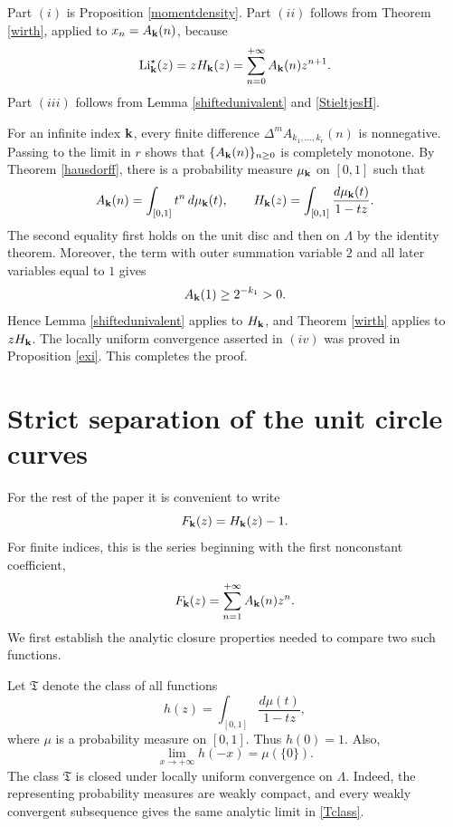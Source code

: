 \documentclass[12pt,a4paper]{amsart}
\makeatletter
\numberwithin{equation}{section}
\renewenvironment{proof}[1][Proof]{%
  \par\pushQED{\qed}%
  \normalfont\topsep6\p@\@plus6\p@\relax
  \trivlist
  \item[\hskip\labelsep\bfseries #1:]\ignorespaces
}{%
  \popQED\endtrivlist\@endpefalse
}
\theoremstyle{plain}
\theoremstyle{definition}
\makeatother
\begin{document}
\begin{proof}[Proof of Theorem \ref{cm}]
Part $(i)$ is Proposition \ref{momentdensity}.  Part $(ii)$ follows from Theorem \ref{wirth}, applied to $x_n=A_{\bf k}(n)$, because
\[
\mathrm{Li}^{\star}_{\bf k}(z)=zH_{\bf k}(z)
=\sum_{n=0}^{+\infty}A_{\bf k}(n)z^{n+1}.
\]
Part $(iii)$ follows from Lemma \ref{shiftedunivalent} and \eqref{StieltjesH}.

For an infinite index ${\bf k}$, every finite difference $\Delta^m A_{k_1,\ldots,k_r}(n)$ is nonnegative.  Passing to the limit in $r$ shows that $\{A_{\bf k}(n)\}_{n\geq 0}$ is completely monotone.  By Theorem \ref{hausdorff}, there is a probability measure $\mu_{\bf k}$ on $[0,1]$ such that
\begin{equation}\label{infiniteStieltjes}
A_{\bf k}(n)=\int_{[0,1]}t^n\,d\mu_{\bf k}(t),
\qquad
H_{\bf k}(z)=\int_{[0,1]}\frac{d\mu_{\bf k}(t)}{1-tz}.
\end{equation}
The second equality first holds on the unit disc and then on $\Lambda$ by the identity theorem.  Moreover, the term with outer summation variable $2$ and all later variables equal to $1$ gives
\[
A_{\bf k}(1)\geq 2^{-k_1}>0.
\]
Hence Lemma \ref{shiftedunivalent} applies to $H_{\bf k}$, and Theorem \ref{wirth} applies to $zH_{\bf k}$.  The locally uniform convergence asserted in $(iv)$ was proved in Proposition \ref{exi}.  This completes the proof.
\end{proof}

\section{Strict separation of the unit circle curves}\label{sec:separation}
For the rest of the paper it is convenient to write
\[
F_{\bf k}(z)=H_{\bf k}(z)-1.
\]
For finite indices, this is the series beginning with the first nonconstant coefficient,
\[
F_{\bf k}(z)=\sum_{n=1}^{+\infty}A_{\bf k}(n)z^n.
\]
We first establish the analytic closure properties needed to compare two such functions.

Let $\mathfrak{T}$ denote the class of all functions
\begin{equation}\label{Tclass}
h(z)=\int_{[0,1]}\frac{d\mu(t)}{1-tz},
\end{equation}
where $\mu$ is a probability measure on $[0,1]$.  Thus $h(0)=1$.  Also,
\begin{equation}\label{atomzero}
\lim_{x\rightarrow+\infty}h(-x)=\mu(\{0\}).
\end{equation}
The class $\mathfrak{T}$ is closed under locally uniform convergence on $\Lambda$.  Indeed, the representing probability measures are weakly compact, and every weakly convergent subsequence gives the same analytic limit in \eqref{Tclass}.
\end{document}
